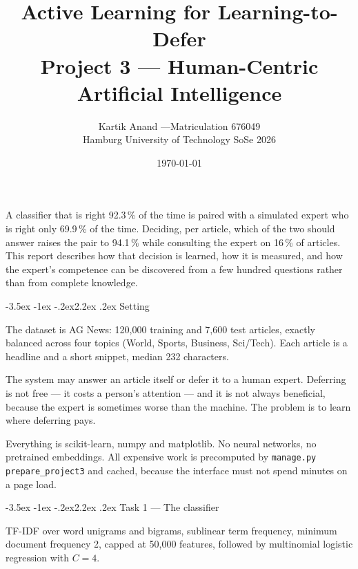 \documentclass[11pt,a4paper]{article}
\title{\vspace{-1.4cm}\sffamily\color{accent}\bfseries
       Active Learning for Learning-to-Defer\\[0.25em]
       \Large\mdseries Project 3 --- Human-Centric Artificial Intelligence}
\author{Kartik Anand \quad---\quad Matriculation 676049\\[0.3em]
        \small Hamburg University of Technology \quad SoSe 2026}
\date{\small \today}
\makeatletter
\renewcommand\section{\@startsection{section}{1}{\z@}%
  {-3.5ex \@plus -1ex \@minus -.2ex}{2.2ex \@plus.2ex}%
  {\normalfont\Large\sffamily\bfseries\color{accent}}}
\newenvironment{callout}
  {\par\medskip\begin{lrbox}{\calloutbuf}%
   \begin{minipage}{\dimexpr\linewidth-24pt\relax}\setlength{\parskip}{0.4em}}
  {\end{minipage}\end{lrbox}%
   \noindent\colorbox{notebg}{\hspace{4pt}\usebox{\calloutbuf}\hspace{4pt}}\par\medskip}
\newcommand{\file}[1]{\texttt{\small #1}}
\makeatother
\begin{document}
\maketitle
\thispagestyle{fancy}

\begin{callout}
A classifier that is right 92.3\,\% of the time is paired with a simulated expert
who is right only 69.9\,\% of the time. Deciding, per article, which of the two
should answer raises the pair to 94.1\,\% while consulting the expert on 16\,\%
of articles. This report describes how that decision is learned, how it is
measured, and how the expert's competence can be discovered from a few hundred
questions rather than from complete knowledge.
\end{callout}

\tableofcontents
\vspace{1em}

\section{Setting}

The dataset is AG News: 120{,}000 training and 7{,}600 test articles, exactly
balanced across four topics (World, Sports, Business, Sci/Tech). Each article is
a headline and a short snippet, median 232 characters.

The system may answer an article itself or defer it to a human expert. Deferring
is not free --- it costs a person's attention --- and it is not always
beneficial, because the expert is sometimes worse than the machine. The problem
is to learn where deferring pays.

Everything is scikit-learn, numpy and matplotlib. No neural networks, no
pretrained embeddings. All expensive work is precomputed by
\file{manage.py prepare\_project3} and cached, because the interface must not
spend minutes on a page load.

\section{Task 1 --- The classifier}

TF-IDF over word unigrams and bigrams, sublinear term frequency, minimum document
frequency 2, capped at 50{,}000 features, followed by multinomial logistic
regression with $C = 4$.
\end{document}
